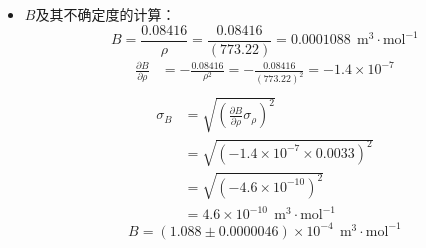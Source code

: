 \documentclass[cn,hazy,pku,12pt,normal,math=newtx,cite=super]{elegantnote}
\begin{document}
\begin{itemize}
\item $B$及其不确定度的计算：
\begin{equation*}
B=\frac{0.08416}{\rho}=\frac{0.08416}{\left(773.22\right)}=0.0001088\ \mathrm{~m^3\cdot mol^{-1}}
\end{equation*}
\begin{equation*}
\begin{aligned}
\frac{\partial B }{\partial \rho }&=- \frac{0.08416}{\rho^{2}}=- \frac{0.08416}{\left(773.22\right)^{2}}=-1.4 \times 10^{-7}\\
\end{aligned}
\end{equation*}
\begin{equation*}
\begin{aligned}
\sigma_{B}&=\sqrt{\left(\frac{\partial B }{\partial \rho } \sigma_{\rho}\right)^2}\\
&=\sqrt{\left(-1.4 \times 10^{-7} \times 0.0033\right)^2}\\   
&=\sqrt{\left(-4.6 \times 10^{-10}\right)^2}\\
&=4.6 \times 10^{-10}\ \mathrm{~m^3\cdot mol^{-1}}
\end{aligned}
\end{equation*}
\begin{equation*}
B=(1.088 \pm 0.0000046)\times 10^{-4} \ \mathrm{~m^3\cdot mol^{-1}}
\end{equation*}


\end{itemize}
\end{document}
